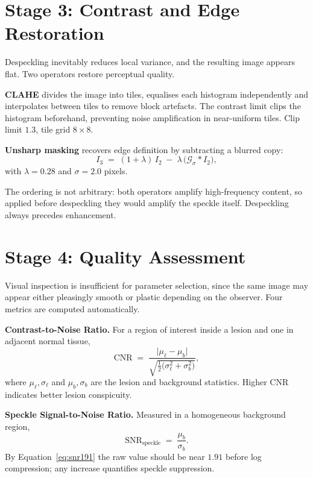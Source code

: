 \documentclass[12pt,a4paper,oneside]{report}
\begin{document}
\section{Stage 3: Contrast and Edge Restoration}

Despeckling inevitably reduces local variance, and the resulting image appears
flat. Two operators restore perceptual quality.

\textbf{CLAHE} \cite{zuiderveld1994clahe} divides the image into tiles, equalises
each histogram independently and interpolates between tiles to remove block
artefacts. The contrast limit clips the histogram beforehand, preventing noise
amplification in near-uniform tiles. Clip limit $1.3$, tile grid $8\times8$.

\textbf{Unsharp masking} recovers edge definition by subtracting a blurred copy:
\begin{equation}
I_3 \;=\; (1+\lambda)\,I_2 \;-\; \lambda\,\bigl(\mathcal{G}_\sigma * I_2\bigr),
\label{eq:unsharp}
\end{equation}
with $\lambda = 0.28$ and $\sigma = 2.0$ pixels.

The ordering is not arbitrary: both operators amplify high-frequency content, so
applied before despeckling they would amplify the speckle itself. Despeckling
always precedes enhancement.

\section{Stage 4: Quality Assessment}

Visual inspection is insufficient for parameter selection, since the same image
may appear either pleasingly smooth or plastic depending on the observer. Four
metrics are computed automatically.

\textbf{Contrast-to-Noise Ratio.} For a region of interest inside a lesion and one
in adjacent normal tissue,
\begin{equation}
\mathrm{CNR} \;=\;
\frac{\bigl|\mu_{\ell}-\mu_{b}\bigr|}
     {\sqrt{\tfrac{1}{2}\bigl(\sigma_{\ell}^{2}+\sigma_{b}^{2}\bigr)}} ,
\label{eq:cnr}
\end{equation}
where $\mu_\ell,\sigma_\ell$ and $\mu_b,\sigma_b$ are the lesion and background
statistics. Higher CNR indicates better lesion conspicuity.

\textbf{Speckle Signal-to-Noise Ratio.} Measured in a homogeneous background
region,
\begin{equation}
\mathrm{SNR}_{\text{speckle}} \;=\; \frac{\mu_b}{\sigma_b}.
\label{eq:snr}
\end{equation}
By Equation~\eqref{eq:snr191} the raw value should be near $1.91$ before log
compression; any increase quantifies speckle suppression.
\end{document}
